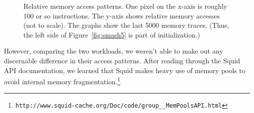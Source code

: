 \documentclass[11pt, oneside]{article}
\newcommand{\fref}[1]{Figure~\ref{#1}}
\begin{document}
\begin{figure}[h]
    \centering
	\caption{Relative memory access patterns. One pixel on the x-axis is 
	roughly 100 or so instructions. The y-axis shows relative memory accesses 
	(not to scale). The graphs show the last 5000 memory traces. (Thus, the 
	left side of \fref{fig:smash5} is part of initialization.)}
	\label{fig:smash}
\end{figure}

However, comparing the two workloads,
we weren't able to make out any discernable difference in their access
patterns. After reading through the Squid API documentation, we learned
that Squid makes heavy use of memory pools to avoid internal memory
fragmentation.\footnote{
{\tt http://www.squid-cache.org/Doc/code/group\_\_MemPoolsAPI.html}}
\end{document}
